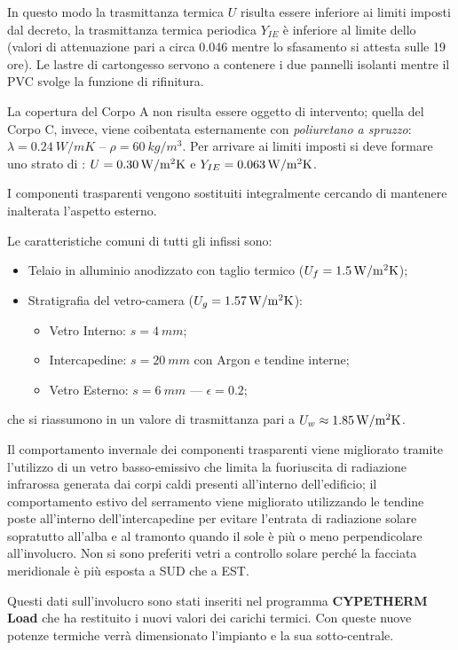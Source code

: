 In questo modo la trasmittanza termica $U$ risulta essere inferiore ai limiti imposti dal decreto, la trasmittanza termica periodica $Y_{IE}$ è inferiore al limite dello  (valori di attenuazione pari a circa \num{0.046} mentre lo sfasamento si attesta sulle \num{19} ore). Le lastre di cartongesso servono a contenere i due pannelli isolanti mentre il PVC svolge la funzione di rifinitura.

La copertura del Corpo A non risulta essere oggetto di intervento; quella del Corpo C, invece, viene coibentata esternamente con \emph{poliuretano a spruzzo}: $\lambda=\SI{0.24}{W/mK}$ -- $\rho=\SI{60}{kg/m^3}$. Per arrivare ai limiti imposti si deve formare uno strato di : $U=\SI{0.30}{\trasm}$ e $Y_{IE}=\SI{0.063}{\trasm}$.

I componenti trasparenti vengono sostituiti integralmente cercando di mantenere inalterata l'aspetto esterno. 

Le caratteristiche comuni di tutti gli infissi sono:
\begin{itemize}
	\item Telaio in alluminio anodizzato con taglio termico ($U_f=\SI{1.5}{\trasm}$);
	\item Stratigrafia del vetro-camera ($U_g=\SI{1.57}{\trasm}$):
		\begin{itemize}
			\item Vetro Interno: $s=\SI{4}{mm}$;
			\item Intercapedine: $s=\SI{20}{mm}$ con Argon e tendine interne;
			\item Vetro Esterno: $s=\SI{6}{mm}$ --- $\epsilon=0.2$;
		\end{itemize}
\end{itemize}
che si riassumono in un valore di trasmittanza pari a $U_w \approx \SI{1.85}{\trasm}$.

Il comportamento invernale dei componenti trasparenti viene migliorato tramite l'utilizzo di un vetro basso-emissivo che limita la fuoriuscita di radiazione infrarossa generata dai corpi caldi presenti all'interno dell'edificio; il comportamento estivo del serramento viene migliorato utilizzando le tendine poste all'interno dell'intercapedine per evitare l'entrata di radiazione solare sopratutto all'alba e al tramonto quando il sole è più o meno perpendicolare all'involucro. Non si sono preferiti vetri a controllo solare perché la facciata meridionale è più esposta a SUD che a EST.

Questi dati sull'involucro sono stati inseriti nel programma \textbf{CYPETHERM Load} che ha restituito i nuovi valori dei carichi termici. Con queste nuove potenze termiche verrà dimensionato l'impianto e la sua sotto-centrale.
